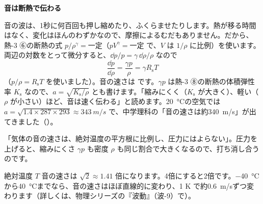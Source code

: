 \noindent\textbf{音は断熱で伝わる}\par\nobreak
音の波は、1秒に何百回も押し縮めたり、ふくらませたりします。熱が移る時間はなく、変化はほんのわずかなので、摩擦によるむだもありません。だから、熱-3 ⑥の断熱の式 $p/\rho^{\gamma}=$一定（$pV^\gamma=$一定 で、$V$ は $1/\rho$ に比例）を使います。両辺の対数をとって微分すると、$\dd p/p=\gamma\,\dd\rho/\rho$ なので
\[ \frac{\dd p}{\dd\rho}=\frac{\gamma p}{\rho}=\gamma R_{\mathrm s}T \]
（$p/\rho=R_{\mathrm s}T$ を使いました）。音の速さは
\label{ph:熱-4:onsoku}です。$\gamma p$ は熱-3 ⑧の断熱の体積弾性率 $K_{\mathrm s}$ なので、$a=\sqrt{K_{\mathrm s}/\rho}$ とも書けます。「縮みにくく（$K_{\mathrm s}$ が大きく）、軽い（$\rho$ が小さい）ほど、音は速く伝わる」と読めます。\qty{20}{\celsius}の空気では $a=\sqrt{1.4\times287\times293}\approx\qty{343}{m/s}$ で、中学理科の「音の速さは約\qty{340}{m/s}」が出てきました（）。

\begin{phyomi}[$a=\sqrt{\gamma R_{\mathrm s}T}$]
「気体の音の速さは、絶対温度の平方根に比例し、圧力にはよらない」。圧力を上げると、縮みにくさ $\gamma p$ も密度 $\rho$ も同じ割合で大きくなるので、打ち消し合うのです。
\end{phyomi}
\begin{phbaisuru}{絶対温度 $T$}
音の速さは $\sqrt2\approx1.41$ 倍になります。4倍にすると2倍です。\qty{-40}{\celsius}から\qty{40}{\celsius}までなら、音の速さはほぼ直線的に変わり、1 K で約\qty{0.6}{m/s}ずつ変わります（詳しくは、物理シリーズの『波動』（波-9）で）。
\par\vspace{2pt}\centering
{}
\end{phbaisuru}


